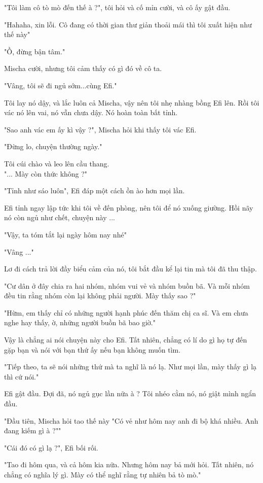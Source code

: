 "Tôi làm cô tò mò đến thế à ?", tôi hỏi và cố mỉn cười, và cô ấy gật đầu.

"Hahaha, xin lỗi. Cô đang có thời gian thư giản thoải mái thì tôi xuất hiện như thế này"

"Ồ, đừng bận tâm."

Mischa cười, nhưng tôi cảm thấy có gì đó về cô ta.

"Vâng, tôi sẽ đi ngủ sớm...cùng Efi."

Tôi lay nó dậy, và lắc luôn cả Mischa, vậy nên tôi nhẹ nhàng bồng Efi lên. Rồi tôi vác nó lên vai, nó vẫn chưa dậy. Nó hoàn toàn bất tỉnh.

"Sao anh vác em ấy kì vậy ?", Mischa hỏi khi thấy tôi vác Efi.

"Đừng lo, chuyện thường ngày."

Tôi cúi chào và leo lên cầu thang.\\


"... Mày còn thức không ?"

"Tỉnh như sáo luôn", Efi đáp một cách ồn ào hơn mọi lần.

Efi tỉnh ngay lập tức khi tôi về đến phòng, nên tôi để nó xuống giường. Hồi nãy nó còn ngủ như chết, chuyện này ...

"Vậy, ta tóm tắt lại ngày hôm nay nhé"

"Vâng ..."

Lơ đi cách trả lời đầy biểu cảm của nó, tôi bắt đầu kể lại tin mà tôi đã thu thập.

"Cư dân ở đây chia ra hai nhóm, nhóm vui vẻ và nhóm buồn bã. Và mỗi nhóm đều tin rằng nhóm còn lại không phải người. Mày thấy sao ?"

"Hừm, em thấy chỉ có những người hạnh phúc đến thăm chị ca sĩ. Và em chưa nghe hay thấy, ờ, những người buồn bã bao giờ."

Vậy là chẳng ai nói chuyện này cho Efi. Tất nhiên, chẳng có lí do gì họ tự đến gặp bạn và nói với bạn thứ ấy nếu bạn không muốn tìm.

"Tiếp theo, ta sẽ nói những thứ mà ta nghĩ là nó lạ. Như mọi lần, mày thấy gì lạ thì cứ nói."

Efi gật đầu. Đợi đã, nó ngủ gục lần nữa à ? Tôi nhéo cằm nó, nó giật mình ngẩn đầu.

"Đầu tiên, Mischa hỏi tao thế này "Có vẻ như hôm nay anh đi bộ khá nhiều. Anh đang kiếm gì à ?""

"Cái đó có gì lạ ?", Efi bối rối.

"Tao đi hôm qua, và cả hôm kia nữa. Nhưng hôm nay bả mới hỏi. Tất nhiên, nó chẳng có nghĩa lý gì. Mày có thể nghĩ rằng tự nhiên bả tò mò."

